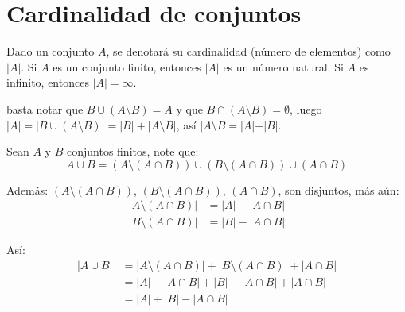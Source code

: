 \section{Cardinalidad de conjuntos}%
\label{sec:Cardinalidad de conjuntos}

Dado un conjunto $A$, se denotará su cardinalidad (número de elementos) como $|A|$. Si $A$ es un conjunto finito, entonces $|A|$ es un número natural. Si $A$ es infinito, entonces $|A|=\infty$.


\begin{enefecto}
	basta notar que $B \cup (A \setminus B) = A$ y que $B \cap (A \setminus B) = \emptyset$, luego $|A| = |B \cup (A \setminus B)| = |B| + |A \setminus B|$, así $|A \setminus B = |A| - |B|$.
\end{enefecto}


\begin{enefecto}
	Sean $A$ y $B$ conjuntos finitos, note que:
	\begin{equation*}
		A \cup B = (A \setminus (A \cap B)) \cup (B \setminus (A \cap B)) \cup (A \cap B)
	\end{equation*}

	Además: $(A \setminus (A \cap B))$, $(B \setminus (A \cap B))$, $(A \cap B)$, son disjuntos, más aún:
	\begin{align*}
		|A \setminus (A \cap B)| & = |A| - |A \cap B| \\
		|B \setminus (A \cap B)| & = |B| - |A \cap B|
	\end{align*}

	Así:
	\begin{align*}
		|A \cup B| & = |A \setminus (A \cap B)| + |B \setminus (A \cap B)| + |A \cap B| \\
		           & = |A| - |A \cap B| + |B| - |A \cap B| + |A \cap B|                 \\
		           & = |A| + |B| - |A \cap B|
	\end{align*}
\end{enefecto}

